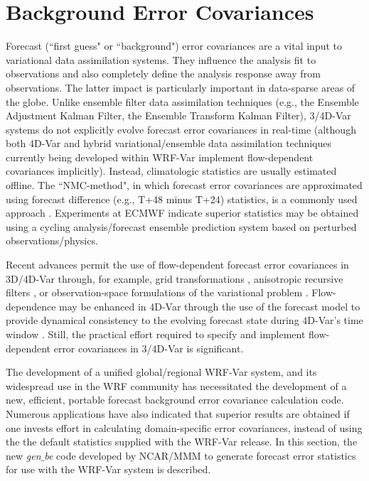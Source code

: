 \section{Background Error Covariances}
\label{var-be}

Forecast (``first guess" or ``background") error covariances are a vital input to variational 
data assimilation systems. They influence the analysis fit to observations and also 
completely define the analysis response away from observations. The latter impact is 
particularly important in data-sparse areas of the globe. Unlike ensemble filter data 
assimilation techniques (e.g., the Ensemble Adjustment Kalman Filter, the Ensemble 
Transform Kalman Filter), 3/4D-Var systems do not explicitly evolve forecast error 
covariances in real-time (although both 4D-Var and hybrid variational/ensemble data assimilation techniques currently being developed within WRF-Var implement flow-dependent covariances implicitly). Instead, climatologic statistics are usually estimated offline. 
The ``NMC-method", in which forecast error covariances are approximated using 
forecast difference (e.g., T+48 minus T+24) statistics, is a commonly used approach 
\citep{parrish92}. Experiments at ECMWF \citep{fisher03} indicate superior statistics may 
be obtained using a cycling analysis/forecast ensemble prediction
system based on perturbed observations/physics.

Recent advances permit the use of flow-dependent forecast error
covariances in 3D/4D-Var through, for example, grid transformations
\citep{desroziers97}, anisotropic recursive filters
\citep{wu02, purser03},
or observation-space formulations of the variational 
problem \citep{daley01}. Flow-dependence may be enhanced in 4D-Var 
through the use of the forecast model to provide dynamical consistency to the evolving 
forecast state during 4D-Var's time window \citep{rabier98}. Still, the practical effort 
required to specify and implement flow-dependent error covariances in 3/4D-Var is 
significant.

The development of a unified global/regional WRF-Var system, and its widespread use
in the WRF community has necessitated the development of a new, efficient, portable forecast background error covariance calculation code. Numerous applications have also indicated
that superior results are obtained if one invests effort in calculating domain-specific 
error covariances, instead of using the the default statistics supplied with the WRF-Var 
release. In this section, the new {\it gen$\_$be} code developed by NCAR/MMM to generate 
forecast error statistics for use with the WRF-Var system is described.

